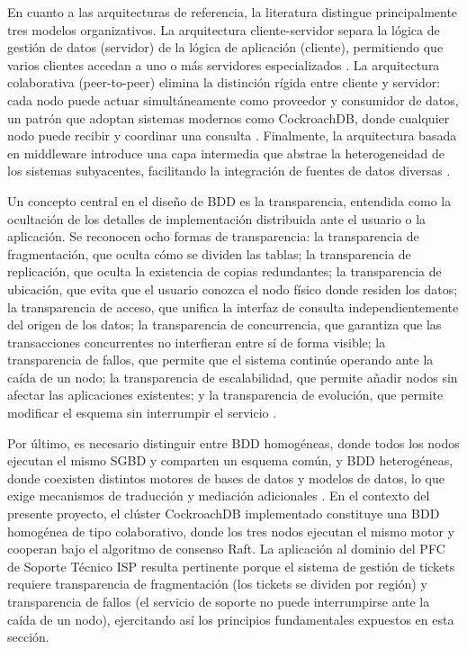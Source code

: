 \documentclass[12pt, a4paper]{article}
\begin{document}
En cuanto a las arquitecturas de referencia, la literatura distingue principalmente tres modelos organizativos. La arquitectura cliente-servidor separa la lógica de gestión de datos (servidor) de la lógica de aplicación (cliente), permitiendo que varios clientes accedan a uno o más servidores especializados \cite{ozsu2020principles}. La arquitectura colaborativa (peer-to-peer) elimina la distinción rígida entre cliente y servidor: cada nodo puede actuar simultáneamente como proveedor y consumidor de datos, un patrón que adoptan sistemas modernos como CockroachDB, donde cualquier nodo puede recibir y coordinar una consulta \cite{ozsu2020principles}. Finalmente, la arquitectura basada en middleware introduce una capa intermedia que abstrae la heterogeneidad de los sistemas subyacentes, facilitando la integración de fuentes de datos diversas \cite{kleppmann2017designing}.

Un concepto central en el diseño de BDD es la transparencia, entendida como la ocultación de los detalles de implementación distribuida ante el usuario o la aplicación. Se reconocen ocho formas de transparencia: la transparencia de fragmentación, que oculta cómo se dividen las tablas; la transparencia de replicación, que oculta la existencia de copias redundantes; la transparencia de ubicación, que evita que el usuario conozca el nodo físico donde residen los datos; la transparencia de acceso, que unifica la interfaz de consulta independientemente del origen de los datos; la transparencia de concurrencia, que garantiza que las transacciones concurrentes no interfieran entre sí de forma visible; la transparencia de fallos, que permite que el sistema continúe operando ante la caída de un nodo; la transparencia de escalabilidad, que permite añadir nodos sin afectar las aplicaciones existentes; y la transparencia de evolución, que permite modificar el esquema sin interrumpir el servicio \cite{ozsu2020principles}.

Por último, es necesario distinguir entre BDD homogéneas, donde todos los nodos ejecutan el mismo SGBD y comparten un esquema común, y BDD heterogéneas, donde coexisten distintos motores de bases de datos y modelos de datos, lo que exige mecanismos de traducción y mediación adicionales \cite{ozsu2020principles}. En el contexto del presente proyecto, el clúster CockroachDB implementado constituye una BDD homogénea de tipo colaborativo, donde los tres nodos ejecutan el mismo motor y cooperan bajo el algoritmo de consenso Raft. La aplicación al dominio del PFC de Soporte Técnico ISP resulta pertinente porque el sistema de gestión de tickets requiere transparencia de fragmentación (los tickets se dividen por región) y transparencia de fallos (el servicio de soporte no puede interrumpirse ante la caída de un nodo), ejercitando así los principios fundamentales expuestos en esta sección.
\end{document}
